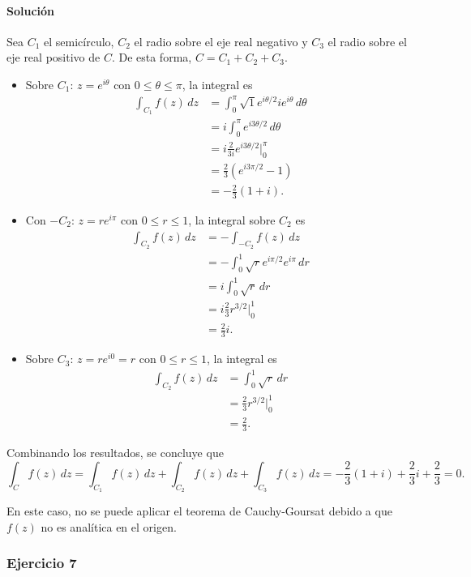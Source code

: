 \documentclass[a4paper]{report}
\begin{document}
\paragraph{Solución} Sea \(C_1\) el semicírculo, \(C_2\) el radio sobre el eje real negativo y \(C_3\) el radio sobre el eje real positivo de \(C\). De esta forma, \(C=C_1+C_2+C_3\).
\begin{itemize}
 \item Sobre \(C_1:\,z=e^{i\theta}\) con \(0\leq\theta\leq\pi\), la integral es
 \begin{align*}
  \int_{C_1}f(z)\,dz&=\int_0^\pi\sqrt{1}e^{i\theta/2}ie^{i\theta}\,d\theta\\
   &=i\int_0^\pi e^{i3\theta/2}\,d\theta\\
   &=i \frac{2}{3i}e^{i3\theta/2}\bigg|_0^\pi\\
   &=\frac{2}{3}\left(e^{i3\pi/2}-1\right)\\
   &=-\frac{2}{3}(1+i).
 \end{align*}
 \item Con \(-C_2:\,z=re^{i\pi}\) con \(0\leq r\leq1\), la integral sobre \(C_2\) es
 \begin{align*}
  \int_{C_2}f(z)\,dz&=-\int_{-C_2}f(z)\,dz\\
   &=-\int_0^1\sqrt{r}e^{i\pi/2}e^{i\pi}\,dr\\
   &=i\int_0^1\sqrt{r}\,dr\\
   &=i\frac{2}{3}r^{3/2}\bigg|_0^1\\
   &=\frac{2}{3}i.
 \end{align*}
 \item Sobre \(C_3:\,z=re^{i0}=r\) con \(0\leq r\leq1\), la integral es
 \begin{align*}
  \int_{C_2}f(z)\,dz&=\int_0^1\sqrt{r}\,dr\\
   &=\frac{2}{3}r^{3/2}\bigg|_0^1\\
   &=\frac{2}{3}.
 \end{align*}
\end{itemize}
Combinando los resultados, se concluye que 
\[
 \int_{C}f(z)\,dz=\int_{C_1}f(z)\,dz+\int_{C_2}f(z)\,dz+\int_{C_3}f(z)\,dz=-\frac{2}{3}(1+i)+\frac{2}{3}i+\frac{2}{3}=0.
\]

En este caso, no se puede aplicar el teorema de Cauchy-Goursat debido a que \(f(z)\) no es analítica en el origen.

\subsubsection*{Ejercicio 7}
\end{document}
